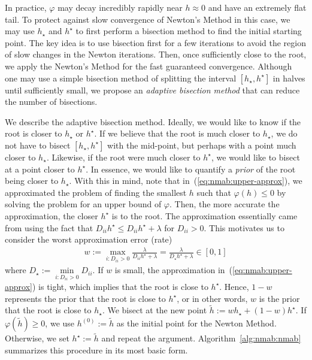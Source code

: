 \documentclass[fontsize=11pt]{article}
\begin{document}
In practice, $\varphi$ may decay incredibly rapidly near $h \approx 0$ and have an extremely flat tail.
To protect against slow convergence of Newton's Method in this case,
we may use $h_\star$ and $h^\star$ to first perform a bisection method to find the initial starting point.
The key idea is to use bisection first for a few iterations 
to avoid the region of slow changes in the Newton iterations.
Then, once sufficiently close to the root, we apply the Newton's Method for the fast guaranteed convergence.
Although one may use a simple bisection method of splitting the interval $[h_\star, h^\star]$ in halves
until sufficiently small, we propose an \emph{adaptive bisection method} that can reduce the number of bisections.

We describe the adaptive bisection method.
Ideally, we would like to know if the root is closer to $h_\star$ or $h^\star$.
If we believe that the root is much closer to $h_\star$,
we do not have to bisect $[h_\star, h^\star]$ with the mid-point, 
but perhaps with a point much closer to $h_\star$.
Likewise, if the root were much closer to $h^\star$, 
we would like to bisect at a point closer to $h^\star$.
In essence, we would like to quantify a \emph{prior} of 
the root being closer to $h_\star$.
With this in mind, note that in~(\ref{eq:nmab:upper-approx}), we 
approximated the problem of finding the smallest $h$ such that $\varphi(h) \leq 0$
by solving the problem for an upper bound of $\varphi$.
Then, the more accurate the approximation, the closer $h^\star$ is to the root.
The approximation essentially came from using the fact that $D_{ii} h^\star \leq D_{ii} h^\star + \lambda$
for $D_{ii} > 0$.
This motivates us to consider the worst approximation error (rate)
\begin{align*}
    w
    := 
    \max\limits_{i: D_{ii} > 0} \frac{\lambda}{D_{ii} h^\star + \lambda}
    =
    \frac{\lambda}{D_\star h^\star + \lambda}
    \in 
    [0,1]
\end{align*}
where $D_\star := \min\limits_{i : D_{ii} > 0} D_{ii}$.
If $w$ is small, the approximation in~(\ref{eq:nmab:upper-approx}) is tight,
which implies that the root is close to $h^\star$.
Hence, $1-w$ represents the prior that the root is close to $h^\star$,
or in other words, $w$ is the prior that the root is close to $h_\star$.
We bisect at the new point $\tilde{h} := wh_\star + (1-w)h^\star$.
If $\varphi(\tilde{h}) \geq 0$, we use $h^{(0)} := \tilde{h}$ as the initial point for the Newton Method.
Otherwise, we set $h^\star := \tilde{h}$ and repeat the argument.
Algorithm~\ref{alg:nmab:nmab} summarizes this procedure in its most basic form.
\end{document}
